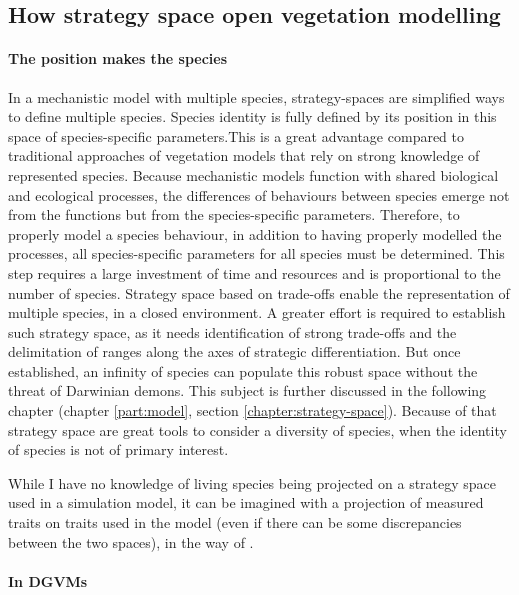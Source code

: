 \subsection{How strategy space open vegetation modelling}


\paragraph{The position makes the species}

In a mechanistic model with multiple species, strategy-spaces are simplified ways to define multiple species. Species identity is fully defined by its position in this space of species-specific parameters.This is a great advantage compared to traditional approaches of vegetation models that rely on strong knowledge of represented species. Because mechanistic models function with shared biological and ecological processes, the differences of behaviours between species emerge not from the functions but from the species-specific parameters. Therefore, to properly model a species behaviour, in addition to having properly modelled the processes, all species-specific parameters for all species must be determined. This step requires a large investment of time and resources and is proportional to the number of species. Strategy space based on trade-offs enable the representation of multiple species, in a closed environment. A greater effort is required to establish such strategy space, as it needs identification of strong trade-offs and the delimitation of ranges along the axes of strategic differentiation. But once established, an infinity of species can populate this robust space without the threat of Darwinian demons. This subject is further discussed in the following chapter (chapter \ref{part:model}, section \ref{chapter:strategy-space}). Because of that strategy space are great tools to consider a diversity of species, when the identity of species is not of primary interest.

While I have no knowledge of living species being projected on a strategy space used in a simulation model, it can be imagined with a projection of measured traits on traits used in the model (even if there can be some discrepancies between the two spaces), in the way of \cite{pierce_allocating_2013}.

\paragraph{In DGVMs}



